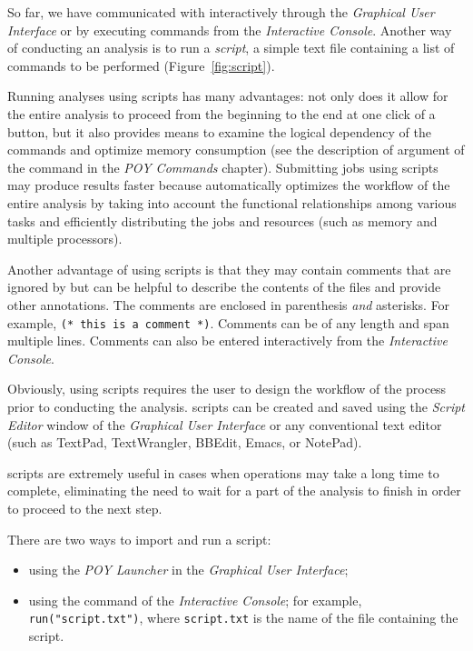 {So far, we have communicated with \poy interactively through the \emph{Graphical User Interface} or by executing commands from the \emph{Interactive Console}. Another way of conducting an analysis is to run a \emph{script}, a simple text file containing a list of commands to be performed (Figure~\ref{fig:script}). 

Running analyses using scripts has many advantages: not only does it allow for the entire analysis to proceed from the beginning to the end at one click of a button, but it also provides means to examine the logical dependency of the commands and optimize memory consumption (see the description of  argument of the command  in the \emph{POY Commands} chapter). Submitting jobs using scripts may produce results faster because \poy automatically optimizes the workflow of the entire analysis by taking into account the functional relationships among various tasks and efficiently distributing the jobs and resources (such as memory and multiple processors).

Another advantage of using scripts is that they may contain comments that are ignored by \poy but can be helpful to describe the contents of the files and provide other annotations. The comments are enclosed in parenthesis \emph{and} asterisks. For example, \texttt{(* this is a comment *)}. Comments can be of any length and span multiple lines. Comments can also be entered interactively from the \emph{Interactive Console}.

Obviously, using scripts requires the user to design the workflow of the process prior to conducting the analysis. \poy scripts can be created and saved using the \emph{Script Editor} window of the \poy \emph{Graphical User Interface} or any conventional text editor (such as TextPad, TextWrangler, BBEdit, Emacs, or NotePad).

\poy scripts are extremely useful in cases when operations may take a long time to complete, eliminating the need to wait for a part of the analysis to finish in order to proceed to the next step.

There are two ways to import and run a script:
\begin{itemize}
    \item using the \emph{POY Launcher} in the \emph{Graphical User Interface};
    \item using the command  of the \emph{Interactive Console}; for example, \texttt{run("script.txt")}, where \texttt{script.txt} is the name of the file containing the script.
\end{itemize}

}

